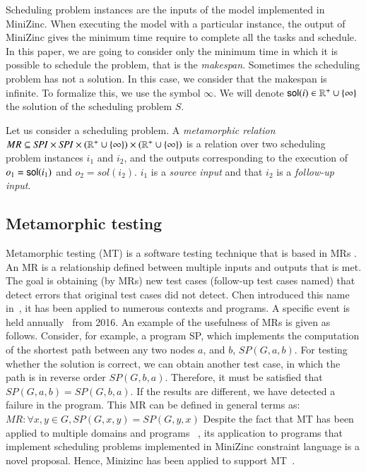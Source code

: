Scheduling problem instances are the inputs of the model implemented
in MiniZinc. When executing the model with a particular instance, the
output of MiniZinc gives the minimum time require to complete all the
tasks and schedule.
In this paper, we are going to
consider only the minimum time in which it is possible to
schedule the problem, that is the \emph{makespan}. Sometimes the
scheduling problem has not a solution. In this case, we consider that
the makespan is infinite. To formalize this, we use
the symbol $\infty$. We will denote
$\mathsf{sol}(i)\in\mathbb{R}^{+}\cup\{\infty\}$\footnotemark the solution of the scheduling
problem $S$.


\begin{definition}
Let us consider a scheduling problem.
A \emph{metamorphic relation}  $MR\subseteq\mathit{SPI}\times\mathit{SPI}\times(\mathbb{R}^{+}\cup\{\infty\})\times(\mathbb{R}^{+}\cup\{\infty\})$
is a relation over two
scheduling problem instances $i_1$ and $i_2$, and the outputs
corresponding
to the execution of $o_{1}=\mathsf{sol}(i_1)$ and $o_{2}=sol(i_2)$.
$i_1$ is a \emph{source input} and that $i_2$ is a \emph{follow-up input}.
\end{definition}

\subsection{Metamorphic testing}
Metamorphic testing (MT) is a software testing technique that is based in MRs \cite{segura2011automated}.
An MR is a relationship defined between multiple inputs and outputs that is met.
The goal is obtaining (by MRs) new test cases (follow-up test cases named) that detect errors that original test cases did not detect. Chen introduced this name in~\cite{chen1998metamorphic}, it has been applied to numerous contexts and programs. A specific event is held annually~\cite{ 7961643,Xie:2019:3340651} from 2016.
An example of the usefulness of MRs is given as follows. Consider, for example, a program SP, which implements the computation of the shortest path between any two nodes $a$, and $b$, $SP(G,a,b)$. For testing whether the solution is correct, we can obtain another test case, in which the path is in reverse order $SP(G,b,a)$. Therefore, it must be satisfied that $SP(G,a,b)= SP(G,b,a)$. If the results are different, we have detected a failure in the program. This MR can be defined in general terms as:
$MR: \forall x, y \in G, SP(G, x,y) = SP(G, y,x) $
Despite the fact that MT has been applied to multiple domains and programs ~\cite{Chen:2018:MTR:3177787.3143561,almendros2021metamorphic}, its application to programs that implement scheduling problems implemented in MiniZinc constraint language is a novel proposal. Hence, Minizinc has been applied to support MT~\cite{de2019using}.\\


